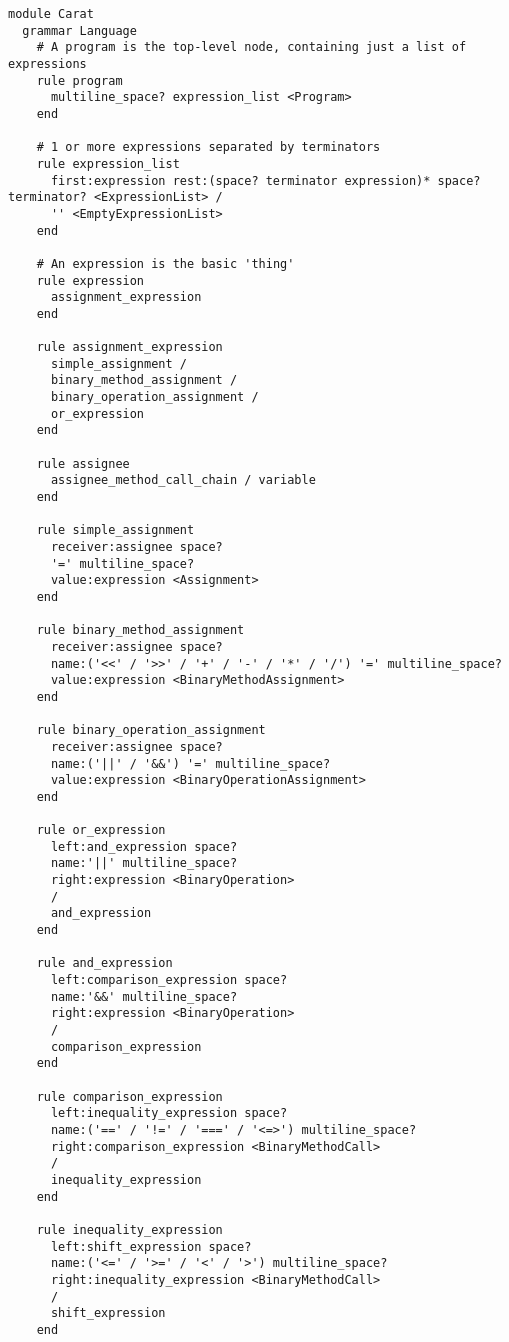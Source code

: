\begin{lstlisting}[title={\small\Helvetica parser/language.treetop},language=treetop]
module Carat
  grammar Language
    # A program is the top-level node, containing just a list of expressions
    rule program
      multiline_space? expression_list <Program>
    end
    
    # 1 or more expressions separated by terminators
    rule expression_list
      first:expression rest:(space? terminator expression)* space? terminator? <ExpressionList> /
      '' <EmptyExpressionList>
    end
    
    # An expression is the basic 'thing'
    rule expression
      assignment_expression
    end
    
    rule assignment_expression
      simple_assignment /
      binary_method_assignment /
      binary_operation_assignment /
      or_expression
    end
    
    rule assignee
      assignee_method_call_chain / variable
    end
    
    rule simple_assignment
      receiver:assignee space?
      '=' multiline_space?
      value:expression <Assignment>
    end
    
    rule binary_method_assignment
      receiver:assignee space?
      name:('<<' / '>>' / '+' / '-' / '*' / '/') '=' multiline_space?
      value:expression <BinaryMethodAssignment>
    end
    
    rule binary_operation_assignment
      receiver:assignee space?
      name:('||' / '&&') '=' multiline_space?
      value:expression <BinaryOperationAssignment>
    end
    
    rule or_expression
      left:and_expression space?
      name:'||' multiline_space?
      right:expression <BinaryOperation>
      /
      and_expression
    end
    
    rule and_expression
      left:comparison_expression space?
      name:'&&' multiline_space?
      right:expression <BinaryOperation>
      /
      comparison_expression
    end
    
    rule comparison_expression
      left:inequality_expression space?
      name:('==' / '!=' / '===' / '<=>') multiline_space?
      right:comparison_expression <BinaryMethodCall>
      /
      inequality_expression
    end
    
    rule inequality_expression
      left:shift_expression space?
      name:('<=' / '>=' / '<' / '>') multiline_space?
      right:inequality_expression <BinaryMethodCall>
      /
      shift_expression
    end
    

\end{lstlisting}
